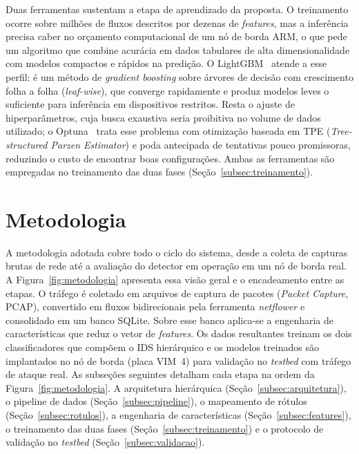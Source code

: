 \documentclass[12pt]{article}
\begin{document}
Duas ferramentas sustentam a etapa de aprendizado da proposta. O treinamento
ocorre sobre milhões de fluxos descritos por dezenas de \textit{features}, mas a
inferência precisa caber no orçamento computacional de um nó de borda ARM, o que
pede um algoritmo que combine acurácia em dados tabulares de alta
dimensionalidade com modelos compactos e rápidos na predição. O
LightGBM~\cite{ke:17} atende a esse perfil: é um método de \textit{gradient
boosting} sobre árvores de decisão com crescimento folha a folha
(\textit{leaf-wise}), que converge rapidamente e produz modelos leves o
suficiente para inferência em dispositivos restritos. Resta o ajuste de
hiperparâmetros, cuja busca exaustiva seria proibitiva no volume de dados
utilizado; o Optuna~\cite{akiba:19} trata esse problema com otimização baseada
em TPE (\textit{Tree-structured Parzen Estimator}) e poda antecipada de
tentativas pouco promissoras, reduzindo o custo de encontrar boas configurações.
Ambas as ferramentas são empregadas no treinamento das duas fases
(Seção~\ref{subsec:treinamento}).

\section{Metodologia}
\label{sec:metodologia}

A metodologia adotada cobre todo o ciclo do sistema, desde a coleta de capturas
brutas de rede até a avaliação do detector em operação em um nó de borda real.
A Figura~\ref{fig:metodologia} apresenta essa visão geral e o encadeamento entre
as etapas. O tráfego é coletado em arquivos de captura de pacotes (\textit{Packet
Capture}, PCAP), convertido em fluxos bidirecionais pela ferramenta
\textit{netflower} e consolidado em um banco SQLite. Sobre esse banco aplica-se a
engenharia de características que reduz o vetor de \textit{features}. Os dados
resultantes treinam os dois classificadores que compõem o IDS hierárquico e os
modelos treinados são implantados no nó de borda (placa VIM~4) para validação no
\textit{testbed} com tráfego de ataque real. As subseções seguintes detalham cada etapa na ordem da Figura~\ref{fig:metodologia}. A arquitetura hierárquica (Seção~\ref{subsec:arquitetura}), o pipeline de dados (Seção~\ref{subsec:pipeline}), o mapeamento de rótulos
(Seção~\ref{subsec:rotulos}), a engenharia de características
(Seção~\ref{subsec:features}), o treinamento das duas fases
(Seção~\ref{subsec:treinamento}) e o protocolo de validação no \textit{testbed}
(Seção~\ref{subsec:validacao}).
\end{document}
